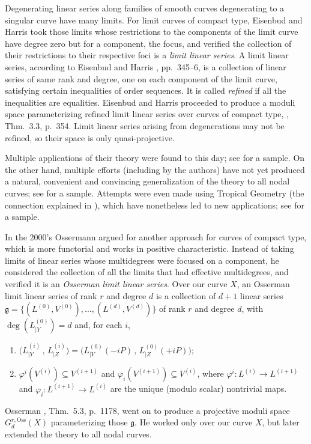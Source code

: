 \documentclass[a4paper,11pt]{amsart}
\theoremstyle{plain}
\theoremstyle{definition}
\theoremstyle{remark}
\begin{document}
Degenerating linear series along families of smooth curves degenerating to a singular curve have many limits. For limit curves of compact type, Eisenbud and Harris \cite{EH1} took those limits whose restrictions to the components of the limit curve have degree zero but for a component, the focus, and verified the collection of their restrictions to their respective foci is a \emph{limit linear series}. A limit linear series, according to Eisenbud and Harris \cite{EH1}, pp.~345--6, is a collection of linear series of same rank and degree, one on each component of the limit curve, satisfying certain inequalities of order sequences. It is called \emph{refined} if all the inequalities are equalities. Eisenbud and Harris proceeded to produce a moduli space parameterizing refined limit linear series over curves of compact type, \cite{EH1}, Thm.~3.3, p.~354. 
Limit linear series arising from degenerations may not be refined, so their space is only quasi-projective.

Multiple applications of their theory were found to this day; see \cite{EH2,EH3,EH4,Cot,Tar,Cast,Fark1,Fark2} for a sample. On the other hand, multiple efforts (including by the authors) have not yet produced a natural, convenient and convincing generalization of the theory to all nodal curves; see \cite{Ran,Ee,EM,ES,Oss1,Oss2,ENR,ESVI,ESVII} for a sample. Attempts were even made using Tropical Geometry (the connection explained in \cite{OssT}), which have nonetheless led to new applications; see \cite{BN,AB,CDP,JP1,JP2} for a sample.

In the 2000's Ossermann \cite{Oss1} argued for another approach for curves of compact type, which is more functorial and works in positive characteristic. Instead of taking limits of linear series whose multidegrees were focused on a component, he considered the collection of all the limits that had effective multidegrees, and verified it is an \emph{Osserman limit linear series}. Over our curve $X$, an Osserman limit linear series of rank $r$ and degree $d$ is a collection of $d+1$ linear series $\mathfrak g=\{(L^{(0)},V^{(0)}),\dots,(L^{(d)},V^{(d)})\}$ of rank $r$ and degree $d$, with $\deg(L^{(0)}_{|Y})=d$ and, for each $i$,
\begin{enumerate}
    \item $\big(L^{(i)}_{|Y}\,,\, L^{(i)}_{|Z}\big)=\big(L^{(0)}_{|Y}(-iP)\,,\, L^{(0)}_{|Z}(+iP)\big)$;
    \item $\varphi^i(V^{(i)})\subseteq V^{(i+1)}$ and $\varphi_i(V^{(i+1)})\subseteq V^{(i)}$, where $\varphi^i\colon L^{(i)}\to L^{(i+1)}$ and $\varphi_i\colon L^{(i+1)}\to L^{(i)}$ are the unique (modulo scalar) nontrivial maps.
\end{enumerate}
Osserman \cite{Oss1}, Thm.~5.3, p.~1178, went on to produce a projective moduli space $G^{r,\text{Oss}}_d(X)$ parameterizing those $\mathfrak g$. He worked only over our curve $X$, but later \cite{Oss2} extended the theory to all nodal curves.
\end{document}
